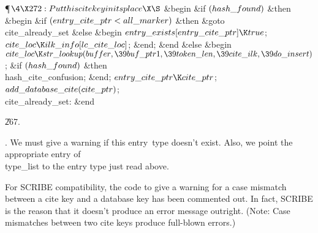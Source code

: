 \Y\P$\4\X272:Put this cite key in its place\X\S$\6
\&{begin} \&{if} $(\\{hash\_found})$ \1\&{then}\6
\&{begin} \&{if} $(\\{entry\_cite\_ptr}<\\{all\_marker})$ \1\&{then}\5
\&{goto} \\{cite\_already\_set}\6
\4\&{else} \&{begin} $\\{entry\_exists}[\\{entry\_cite\_ptr}]\K\\{true}$;\5
$\\{cite\_loc}\K\\{ilk\_info}[\\{lc\_cite\_loc}]$;\6
\&{end};\2\6
\&{end}\6
\4\&{else} \&{begin} \6
$\\{cite\_loc}\K\\{str\_lookup}(\\{buffer},\39\\{buf\_ptr1},\39\\{token\_len},%
\39\\{cite\_ilk},\39\\{do\_insert})$;\6
\&{if} $(\\{hash\_found})$ \1\&{then}\5
\\{hash\_cite\_confusion};\2\6
\&{end};\2\6
$\\{entry\_cite\_ptr}\K\\{cite\_ptr}$;\5
$\\{add\_database\_cite}(\\{cite\_ptr})$;\6
\4\\{cite\_already\_set}: \&{end}\par
\U267.\fi

.
We must give a warning if this entry~type doesn't exist.  Also, we
point the appropriate entry of \\{type\_list} to the entry type just read
above.

For SCRIBE compatibility, the code to give a warning for a case
mismatch between a cite key and a database key has been commented out.
In fact, SCRIBE is the reason that it doesn't produce an error message
outright.  (Note: Case mismatches between two cite keys produce
full-blown errors.)


